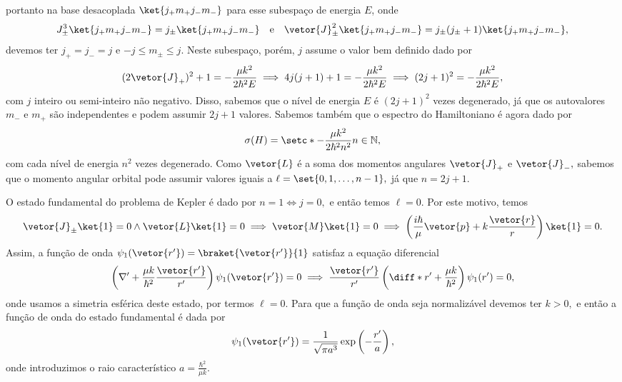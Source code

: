 portanto na base desacoplada \(\ket{j_+ m_+ j_- m_-}\) para esse subespaço de energia \(E\), onde
\begin{equation*}
   J_\pm^3\ket{j_+ m_+ j_- m_-} = j_{\pm} \ket{j_+ m_+ j_- m_-}
   \quad\text{e}\quad
   \vetor{J}_\pm^2\ket{j_+ m_+ j_- m_-} = j_{\pm}(j_\pm + 1)\ket{j_+ m_+ j_- m_-},
\end{equation*}
devemos ter \(j_+ = j_- = j\) e \(-j \leq m_\pm \leq j.\) Neste subespaço, porém, \(j\) assume o valor bem definido dado por
\begin{equation*}
   (2\vetor{J}_+)^2 + 1 = -\frac{\mu k^2}{2\hbar^2 E} \implies 4 j(j+1) + 1 = -\frac{\mu k^2}{2\hbar^2 E} \implies (2j + 1)^2 = -\frac{\mu k^2}{2\hbar^2 E},
\end{equation*}
com \(j\) inteiro ou semi-inteiro não negativo. Disso, sabemos que o nível de energia \(E\) é \((2j + 1)^2\) vezes degenerado, já que os autovalores \(m_-\) e \(m_+\) são independentes e podem assumir \(2j + 1\) valores. Sabemos também que o espectro do Hamiltoniano é agora dado por
\begin{equation*}
   \sigma(H) = \setc*{-\frac{\mu k^2}{2 \hbar^2 n^2}}{n \in \mathbb{N}},
\end{equation*}
com cada nível de energia \(n^2\) vezes degenerado. Como \(\vetor{L}\) é a soma dos momentos angulares \(\vetor{J}_+\) e \(\vetor{J}_-,\) sabemos que o momento angular orbital pode assumir valores iguais a \(\ell = \set{0, 1,\dots, n-1},\) já que \(n = 2j + 1.\)

O estado fundamental do problema de Kepler é dado por \(n = 1 \iff j = 0,\) e então temos \(\ell = 0.\) Por este motivo, temos 
\begin{equation*}
   \vetor{J}_\pm \ket{1} = 0 \land \vetor{L}\ket{1} = 0 \implies \vetor{M} \ket{1} = 0 \implies \left(\frac{i \hbar}{\mu}\vetor{p} + k \frac{\vetor{r}}{r}\right) \ket{1} = 0.
\end{equation*}
Assim, a função de onda \(\psi_{1}(\vetor{r'}) = \braket{\vetor{r'}}{1}\) satisfaz a equação diferencial
\begin{equation*}
   \left(\nabla' + \frac{\mu k}{\hbar^2} \frac{\vetor{r'}}{r'}\right)\psi_1(\vetor{r'}) = 0 \implies \frac{\vetor{r'}}{r'}\left(\diff*{}{r'} + \frac{\mu k}{\hbar^2}\right)\psi_1(r') = 0,
\end{equation*}
onde usamos a simetria esférica deste estado, por termos \(\ell = 0.\) Para que a função de onda seja normalizável devemos ter \(k > 0,\) e então a função de onda do estado fundamental é dada por
\begin{equation*}
   \psi_1(\vetor{r'}) = \frac{1}{\sqrt{\pi a^3}}\exp\left(-\frac{r'}{a}\right),
\end{equation*}
onde introduzimos o raio característico \(a = \frac{\hbar^2}{\mu k}.\)

